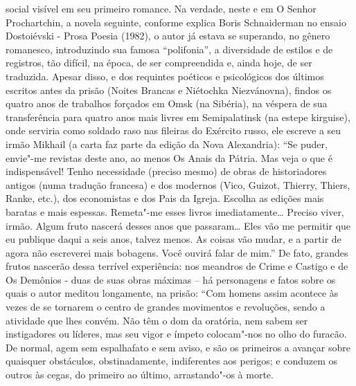 social visível em seu primeiro romance. Na verdade, neste e em O Senhor
Prochartchin, a novela seguinte, conforme explica Boris Schnaiderman no
ensaio Dostoiévski - Prosa Poesia (1982), o autor já estava se
superando, no gênero romanesco, introduzindo sua famosa ``polifonia'', a
diversidade de estilos e de registros, tão difícil, na época, de ser
compreendida e, ainda hoje, de ser traduzida. Apesar disso, e dos
requintes poéticos e psicológicos dos últimos escritos antes da prisão
(Noites Brancas e Niétochka Niezvánovna), findos os quatro anos de
trabalhos forçados em Omsk (na Sibéria), na véspera de sua transferência
para quatro anos mais livres em Semipalatinsk (na estepe kirguise), onde
serviria como soldado raso nas fileiras do Exército russo, ele escreve a
seu irmão Mikhail (a carta faz parte da edição da Nova Alexandria): ``Se
puder, envie"-me revistas deste ano, ao menos Os Anais da Pátria. Mas
veja o que é indispensável! Tenho necessidade (preciso mesmo) de obras
de historiadores antigos (numa tradução francesa) e dos modernos (Vico,
Guizot, Thierry, Thiers, Ranke, etc.), dos economistas e dos Pais da
Igreja. Escolha as edições mais baratas e mais espessas. Remeta"-me esses
livros imediatamente\ldots{} Preciso viver, irmão. Algum fruto nascerá desses
anos que passaram\ldots{} Eles vão me permitir que eu publique daqui a seis
anos, talvez menos. As coisas vão mudar, e a partir de agora não
escreverei mais bobagens. Você ouvirá falar de mim.'' De fato, grandes
frutos nascerão dessa terrível experiência: nos meandros de Crime e
Castigo e de Os Demônios - duas de suas obras máximas -- há personagens
e fatos sobre os quais o autor meditou longamente, na prisão: ``Com
homens assim acontece às vezes de se tornarem o centro de grandes
movimentos e revoluções, sendo a atividade que lhes convém. Não têm o
dom da oratória, nem sabem ser instigadores ou líderes, mas seu vigor e
ímpeto colocam"-nos no olho do furacão. De normal, agem sem espalhafato e
sem aviso, e são os primeiros a avançar sobre quaisquer obstáculos,
obstinadamente, indiferentes aos perigos; e conduzem os outros às cegas,
do primeiro ao último, arrastando"-os à morte.

